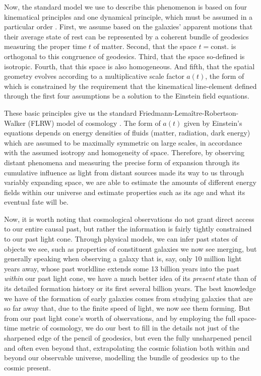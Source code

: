 \documentclass[12pt]{book}
\begin{document}
Now, the standard model we use to describe this phenomenon is based on four kinematical principles and one dynamical principle, which must be assumed in a particular order \citep{Robertson1933,Walker1937,North1965}. First, we assume based on the galaxies' apparent motions that their average state of rest can be represented by a coherent bundle of geodesics measuring the proper time $t$ of matter. Second, that the space $t=\mathrm{const.}$ is orthogonal to this congruence of geodesics. Third, that the space so-defined is isotropic. Fourth, that this space is also homogeneous. And fifth, that the spatial geometry evolves according to a multiplicative scale factor $a(t)$, the form of which is constrained by the requirement that the kinematical line-element defined through the first four assumptions be a solution to the Einstein field equations.

These basic principles give us the standard Friedmann-Lemaître-Robertson-Walker (FLRW) model of cosmology \citep{Friedmann1922,Friedmann1924,Lemaitre1927,Robertson1935,Walker1937}. The form of $a(t)$ given by Einstein's equations depends on energy densities of fluids (matter, radiation, dark energy) which are assumed to be maximally symmetric on large scales, in accordance with the assumed isotropy and homogeneity of space. Therefore, by observing distant phenomena and measuring the precise form of expansion through its cumulative influence as light from distant sources made its way to us through variably expanding space, we are able to estimate the amounts of different energy fields within our universe and estimate properties such as its age and what its eventual fate will be.

Now, it is worth noting that cosmological observations do not grant direct access to our entire causal past, but rather the information is fairly tightly constrained to our past light cone. Through physical models, we can infer past states of objects we see, such as properties of constituent galaxies we now see merging, but generally speaking when observing a galaxy that is, say, only 10 million light years away, whose past worldline extends some 13 billion years into the past \textit{within} our past light cone, we have a much better idea of its \textit{present} state than of its detailed formation history or its first several billion years. The best knowledge we have of the formation of early galaxies comes from studying galaxies that are so far away that, due to the finite speed of light, we now see them forming. But from our past light cone's worth of observations, and by employing the full space-time metric of cosmology, we do our best to fill in the details not just of the sharpened edge of the pencil of geodesics, but even the fully unsharpened pencil and often even beyond that, extrapolating the cosmic foliation both within and beyond our observable universe, modelling the bundle of geodesics up to the cosmic present.
\end{document}
